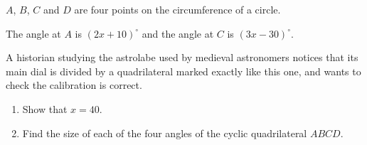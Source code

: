 \begin{question}
\noindent $A$, $B$, $C$ and $D$ are four points on the circumference of a circle.

\noindent The angle at $A$ is $(2x+10)^\circ$ and the angle at $C$ is $(3x-30)^\circ$.

\begin{center}
\end{center}

\noindent A historian studying the astrolabe used by medieval astronomers notices that its main dial is divided by a quadrilateral marked exactly like this one, and wants to check the calibration is correct.

\begin{enumerate}
    \item[(a)] Show that $x = 40$.

    \vspace{4cm}

    \item[(b)] Find the size of each of the four angles of the cyclic quadrilateral $ABCD$.

    \vspace{5cm}
\end{enumerate}
\end{question}